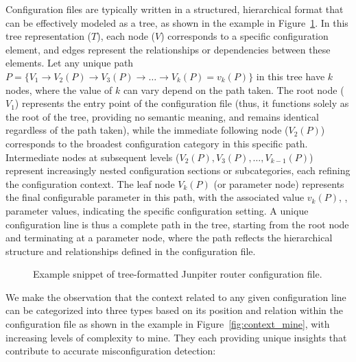     Configuration files are typically written in a structured, hierarchical format that can be effectively modeled as a tree, as shown in the example in Figure~\ref{fig:tree}. In this tree representation (\(T\)), each node (\(V\)) corresponds to a specific configuration element, and edges represent the relationships or dependencies between these elements. Let any unique path \(
P = \{ V_1 \rightarrow V_2(P) \rightarrow V_3(P) \rightarrow \dots \rightarrow V_k(P) = v_k(P) \}
\) in this tree have \(k\) nodes, where the value of \(k\) can vary depend on the path taken. The root node (\(V_1\)) represents the entry point of the configuration file (thus, it functions solely as the root of the tree, providing no semantic meaning, and remains identical regardless of the path taken), while the immediate following node (\(V_2(P)\)) corresponds to the broadest configuration category in this specific path. Intermediate nodes at subsequent levels (\( V_2(P), V_3(P), \dots, V_{k-1}(P) \)) represent increasingly nested configuration sections or subcategories, each refining the configuration context. The leaf node \(V_k(P)\) (or parameter node) represents the final configurable parameter in this path, with the associated value \(v_k(P)\), \ie, parameter values, indicating the specific configuration setting. A unique configuration line is thus a complete path in the tree, starting from the root node and terminating at a parameter node, where the path reflects the hierarchical structure and relationships defined in the configuration file.
\begin{figure}[t]
    \centering
    \caption{Example snippet of tree-formatted Junpiter router configuration file.}
    \label{fig:tree}
\end{figure}
     We make the observation that the context related to any given configuration line can be categorized into three types based on its position and relation within the configuration file as shown in the example in Figure~\ref{fig:context_mine}, with increasing levels of complexity to mine. They each providing unique insights that contribute to accurate misconfiguration detection: 
    
